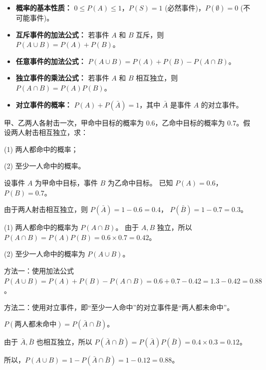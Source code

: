 \begin{theorem}
    \begin{itemize}
        \item \textbf{概率的基本性质：} $0 \le P(A) \le 1$，$P(S) = 1$ (必然事件)，$P(\emptyset) = 0$ (不可能事件)。
        \item \textbf{互斥事件的加法公式：} 若事件 $A$ 和 $B$ 互斥，则 $P(A \cup B) = P(A) + P(B)$。
        \item \textbf{任意事件的加法公式：} $P(A \cup B) = P(A) + P(B) - P(A \cap B)$。
        \item \textbf{独立事件的乘法公式：} 若事件 $A$ 和 $B$ 相互独立，则 $P(A \cap B) = P(A)P(B)$。
        \item \textbf{对立事件的概率：} $P(A) + P(\bar{A}) = 1$，其中 $\bar{A}$ 是事件 $A$ 的对立事件。
    \end{itemize}
\end{theorem}

\begin{example}
    甲、乙两人各射击一次，甲命中目标的概率为 $0.6$，乙命中目标的概率为 $0.7$。假设两人射击相互独立，求：

    (1) 两人都命中的概率；

    (2) 至少一人命中的概率。
\end{example}

\begin{solution}
    设事件 $A$ 为甲命中目标，事件 $B$ 为乙命中目标。
    已知 $P(A) = 0.6$， $P(B) = 0.7$。

    由于两人射击相互独立，则 $P(\bar{A}) = 1 - 0.6 = 0.4$， $P(\bar{B}) = 1 - 0.7 = 0.3$。

    (1) 两人都命中的概率为 $P(A \cap B)$。
    由于 $A, B$ 独立，所以 $P(A \cap B) = P(A)P(B) = 0.6 \times 0.7 = 0.42$。

    (2) 至少一人命中的概率为 $P(A \cup B)$。

    方法一：使用加法公式 $P(A \cup B) = P(A) + P(B) - P(A \cap B) = 0.6 + 0.7 - 0.42 = 1.3 - 0.42 = 0.88$。

    方法二：使用对立事件，即“至少一人命中”的对立事件是“两人都未命中”。

    $P(\text{两人都未命中}) = P(\bar{A} \cap \bar{B})$。

    由于 $\bar{A}, \bar{B}$ 也相互独立，所以 $P(\bar{A} \cap \bar{B}) = P(\bar{A})P(\bar{B}) = 0.4 \times 0.3 = 0.12$。

    所以，$P(A \cup B) = 1 - P(\bar{A} \cap \bar{B}) = 1 - 0.12 = 0.88$。
\end{solution}

